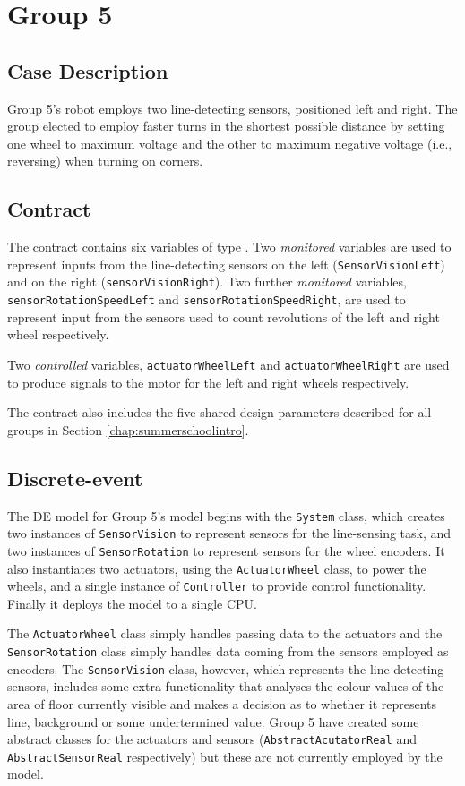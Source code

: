 \section{Group 5}
\subsection{Case Description}
Group 5's robot employs two line-detecting sensors, positioned left
and right.  The group elected to employ faster turns in the shortest
possible distance by setting one wheel to maximum voltage and the
other to maximum negative voltage (i.e., reversing) when turning on
corners.

\subsection{Contract} 
The contract contains six variables of type .  Two
\emph{monitored} variables are used to represent inputs from the
line-detecting sensors on the left (\texttt{SensorVisionLeft}) and on
the right (\texttt{sensorVisionRight}).  Two further \emph{monitored}
variables, \texttt{sensorRotationSpeedLeft} and
\texttt{sensorRotationSpeedRight}, are used to represent input from
the sensors used to count revolutions of the left and right wheel
respectively.

Two \emph{controlled} variables, \texttt{actuatorWheelLeft} and
\texttt{actuatorWheelRight} are used to produce signals to the motor
for the left and right wheels respectively.

The contract also includes the five shared design parameters described
for all groups in Section \ref{chap:summerschoolintro}.

\subsection{Discrete-event} 
The DE model for Group 5's model begins with the \texttt{System}
class, which creates two instances of \texttt{SensorVision} to
represent sensors for the line-sensing task, and two instances of
\texttt{Sensor\-Ro\-ta\-tion} to represent sensors for the wheel encoders.
It also instantiates two actuators, using the \texttt{ActuatorWheel}
class, to power the wheels, and a single instance of
\texttt{Controller} to provide control functionality.  Finally it
deploys the model to a single CPU.

The \texttt{ActuatorWheel} class simply handles passing data to the
actuators and the \texttt{Sensor\-Ro\-ta\-tion} class simply handles data
coming from the sensors employed as encoders.  The
\texttt{Sensor\-Vision} class, however, which represents the
line-detecting sensors, includes some extra functionality that
analyses the colour values of the area of floor currently visible and
makes a decision as to whether it represents line, background or some
undertermined value.  Group 5 have created some abstract classes for
the actuators and sensors (\texttt{AbstractAcutatorReal} and
\texttt{AbstractSensorReal} respectively) but these are not currently
employed by the model.

